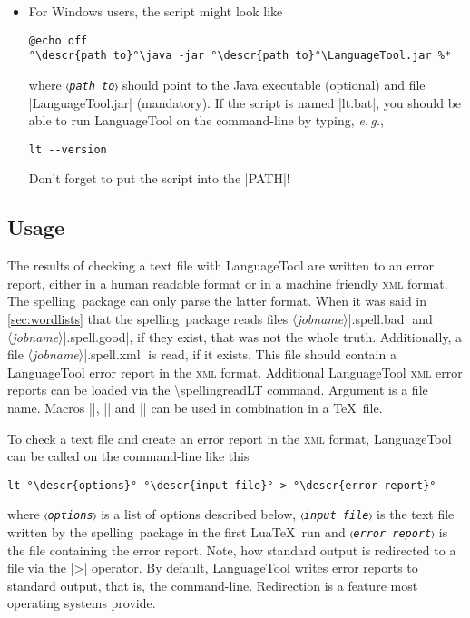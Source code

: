 \documentclass[11pt]{article}
\newcommand*{\pkg}{\textsf{spelling}}
\newcommand*{\acr}[1]{\mbox{\scshape#1}}
\newcommand*{\descr}[1]{〈\emph{#1}〉}
\newcommand*{\cmd}[1]{\mbox{\ttfamily\textbackslash#1}}
\newcommand*{\macro}[1]{\cmd{#1}\marginpar{\cmd{#1}}}
\newcommand*{\latinphrase}[1]{\foreignlanguage{latin}{\emph{#1}}}
\newcommand*{\lpeg}{\latinphrase{e.\,g.}\xspace}
\begin{document}
\begin{enumerate}
\begin{itemize}
  \item For Windows users, the script might look like

\begin{lstlisting}[escapeinside=°°]
@echo off
°\descr{path to}°\java -jar °\descr{path to}°\LanguageTool.jar %*
\end{lstlisting}
%
    where \texttt{\descr{path to}} should point to the Java executable
    (optional) and file |LanguageTool.jar| (mandatory).  If the script
    is named |lt.bat|, you should be able to run LanguageTool on the
    command-line by typing, \lpeg,

\begin{lstlisting}
lt --version
\end{lstlisting}
%
    Don't forget to put the script into the |PATH|!

  \end{itemize}

\end{enumerate}


\subsection{Usage}
\label{sec:lt-usage}

The results of checking a text file with LanguageTool are written to an
error report, either in a human readable format or in a machine friendly
\acr{xml} format.  The \pkg\ package can only parse the latter format.
When it was said in \autoref{sec:wordlists} that the \pkg\ package reads
files \descr{jobname}|.spell.bad| and \descr{jobname}|.spell.good|, if
they exist, that was not the whole truth.  Additionally, a file
\descr{jobname}|.spell.xml| is read, if it exists.  This file should
contain a LanguageTool error report in the \acr{xml} format.  Additional
LanguageTool \acr{xml} error reports can be loaded via the
\macro{spellingreadLT} command.  Argument is a file name.  Macros
|\spellingreadLT|, |\spellingreadbad| and |\spellingreadgood| can be
used in combination in a \TeX\ file.

To check a text file and create an error report in the \acr{xml} format,
LanguageTool can be called on the command-line like this
\begin{lstlisting}[escapeinside=°°]
lt °\descr{options}° °\descr{input file}° > °\descr{error report}°
\end{lstlisting}
where \texttt{\descr{options}} is a list of options described below,
\texttt{\descr{input file}} is the text file written by the \pkg\
package in the first Lua\TeX\ run and \texttt{\descr{error report}} is
the file containing the error report.  Note, how standard output is
redirected to a file via the |>| operator.  By default, LanguageTool
writes error reports to standard output, that is, the command-line.
Redirection is a feature most operating systems provide.
\end{document}
